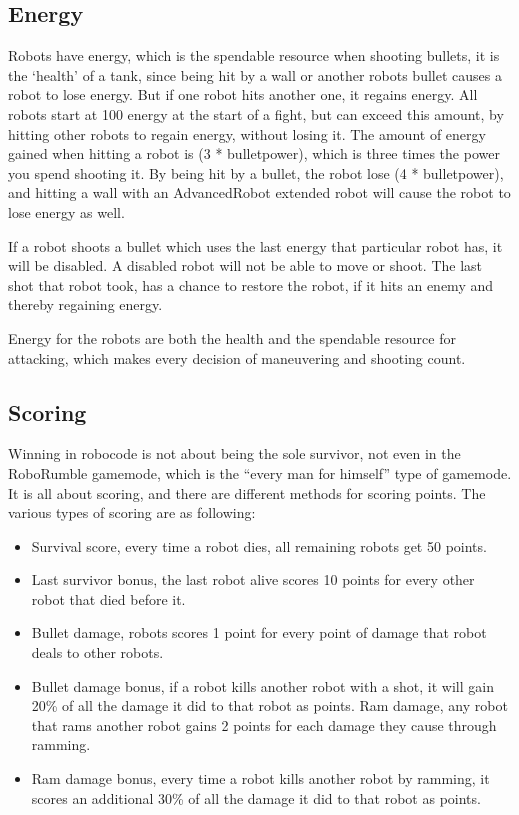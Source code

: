 \subsection{Energy}
Robots have energy, which is the spendable resource when shooting bullets, it is the ‘health’ of a tank, since being hit by a wall or another robots bullet causes a robot to lose energy. But if one robot hits another one, it regains energy. All robots start at 100 energy at the start of a fight, but can exceed this amount, by hitting other robots to regain energy, without losing it. The amount of energy gained when hitting a robot is (3 * bulletpower), which is three times the power you spend shooting it. By being hit by a bullet, the robot lose (4 * bulletpower), and hitting a wall with an AdvancedRobot extended robot will cause the robot to lose energy as well.

If a robot shoots a bullet which uses the last energy that particular robot has, it will be disabled. A disabled robot will not be able to move or shoot. The last shot that robot took, has a chance to restore the robot, if it hits an enemy and thereby regaining energy.
   
Energy for the robots are both the health and the spendable resource for attacking, which makes every decision of maneuvering and shooting count.

\subsection{Scoring}
Winning in robocode is not about being the sole survivor, not even in the RoboRumble gamemode, which is the “every man for himself” type of gamemode. It is all about scoring, and there are different methods for scoring points. The various types of scoring are as following:
\begin{itemize}
\item Survival score, every time a robot dies, all remaining robots get 50 points.
\item Last survivor bonus, the last robot alive scores 10 points for every other robot that died before it.
\item Bullet damage, robots scores 1 point for every point of damage that robot deals to other robots.
\item Bullet damage bonus, if a robot kills another robot with a shot, it will gain 20\% of all the damage it did to that robot as points.
Ram damage, any robot that rams another robot gains 2 points for each damage they cause through ramming.
\item Ram damage bonus, every time a robot kills another robot by ramming, it scores an additional 30\% of all the damage it did to that robot as points.
\end{itemize}

